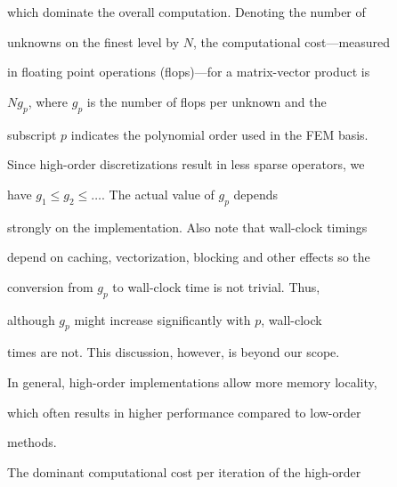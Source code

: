 \documentclass[smallcondensed,final]{svjour3}     %
\begin{document}
which dominate the overall computation. Denoting the number of

unknowns on the finest level by $N$, the computational cost---measured

in floating point operations (flops)---for a matrix-vector product is

$Ng_p$, where $g_p$ is the number of flops per unknown and the

subscript $p$ indicates the polynomial order used in the FEM basis.

Since high-order discretizations result in less sparse operators, we

have $g_1\le g_2\le \ldots$. The actual value of $g_p$ depends

strongly on the implementation. Also note that wall-clock timings

depend on caching, vectorization, blocking and other effects so the

conversion from $g_p$ to wall-clock time is not trivial. Thus,

although $g_p$ might increase significantly with $p$, wall-clock

times are not. This discussion, however, is beyond our scope.








In general, high-order implementations allow more memory locality,

which often results in higher performance compared to low-order

methods.






The dominant computational cost per iteration of the high-order
\end{document}
